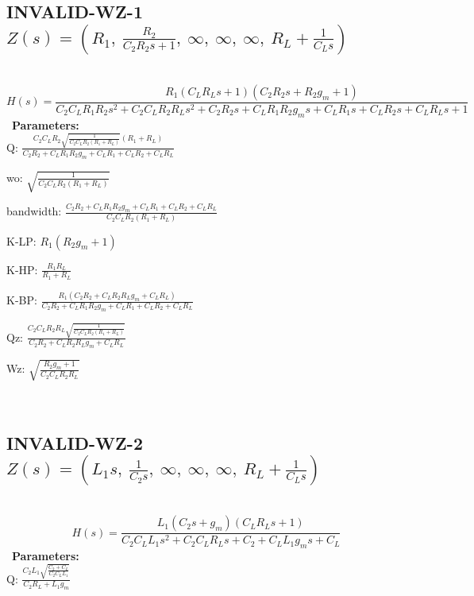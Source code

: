 \documentclass{article}
\begin{document}
\subsection{INVALID-WZ-1 $Z(s) = \left( R_{1}, \  \frac{R_{2}}{C_{2} R_{2} s + 1}, \  \infty, \  \infty, \  \infty, \  R_{L} + \frac{1}{C_{L} s}\right)$ } \ 
\textbf{\[H(s) = \frac{R_{1} \left(C_{L} R_{L} s + 1\right) \left(C_{2} R_{2} s + R_{2} g_{m} + 1\right)}{C_{2} C_{L} R_{1} R_{2} s^{2} + C_{2} C_{L} R_{2} R_{L} s^{2} + C_{2} R_{2} s + C_{L} R_{1} R_{2} g_{m} s + C_{L} R_{1} s + C_{L} R_{2} s + C_{L} R_{L} s + 1}\] } \ 
\textbf{Parameters:}\\ 

Q: $\frac{C_{2} C_{L} R_{2} \sqrt{\frac{1}{C_{2} C_{L} R_{2} \left(R_{1} + R_{L}\right)}} \left(R_{1} + R_{L}\right)}{C_{2} R_{2} + C_{L} R_{1} R_{2} g_{m} + C_{L} R_{1} + C_{L} R_{2} + C_{L} R_{L}}$\ 

wo: $\sqrt{\frac{1}{C_{2} C_{L} R_{2} \left(R_{1} + R_{L}\right)}}$\ 

bandwidth: $\frac{C_{2} R_{2} + C_{L} R_{1} R_{2} g_{m} + C_{L} R_{1} + C_{L} R_{2} + C_{L} R_{L}}{C_{2} C_{L} R_{2} \left(R_{1} + R_{L}\right)}$\ 

K-LP: $R_{1} \left(R_{2} g_{m} + 1\right)$\ 

K-HP: $\frac{R_{1} R_{L}}{R_{1} + R_{L}}$\ 

K-BP: $\frac{R_{1} \left(C_{2} R_{2} + C_{L} R_{2} R_{L} g_{m} + C_{L} R_{L}\right)}{C_{2} R_{2} + C_{L} R_{1} R_{2} g_{m} + C_{L} R_{1} + C_{L} R_{2} + C_{L} R_{L}}$\ 

Qz: $\frac{C_{2} C_{L} R_{2} R_{L} \sqrt{\frac{1}{C_{2} C_{L} R_{2} \left(R_{1} + R_{L}\right)}}}{C_{2} R_{2} + C_{L} R_{2} R_{L} g_{m} + C_{L} R_{L}}$\ 

Wz: $\sqrt{\frac{R_{2} g_{m} + 1}{C_{2} C_{L} R_{2} R_{L}}}$\ 

\ 

\subsection{INVALID-WZ-2 $Z(s) = \left( L_{1} s, \  \frac{1}{C_{2} s}, \  \infty, \  \infty, \  \infty, \  R_{L} + \frac{1}{C_{L} s}\right)$ } \ 
\textbf{\[H(s) = \frac{L_{1} \left(C_{2} s + g_{m}\right) \left(C_{L} R_{L} s + 1\right)}{C_{2} C_{L} L_{1} s^{2} + C_{2} C_{L} R_{L} s + C_{2} + C_{L} L_{1} g_{m} s + C_{L}}\] } \ 
\textbf{Parameters:}\\ 

Q: $\frac{C_{2} L_{1} \sqrt{\frac{C_{2} + C_{L}}{C_{2} C_{L} L_{1}}}}{C_{2} R_{L} + L_{1} g_{m}}$\ 
\end{document}

